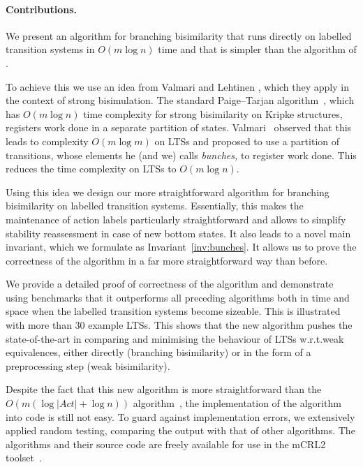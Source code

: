 \documentclass[a4paper,10pt]{article}
\theoremstyle{definition}
\theoremstyle{plain}
\newcommand{\bigo}[1]{{O\!\left(#1\right)}}
\newcommand{\size}[1]{\left\lvert #1 \right\rvert}
\begin{document}
\paragraph{Contributions.}
We present an algorithm for branching bisimilarity that runs directly on labelled transition systems in $\bigo{m \log n}$ time and that is simpler than the algorithm of \cite{GJKW2017,GrooteW16tacas}.

To achieve this we use an idea
from Valmari and Lehtinen \cite{Valmari2009,ValmariL08}, which they apply in the context of strong bisimulation.
The standard Paige--Tarjan algorithm~\cite{PT87},
which has $\bigo{m \log n}$ time complexity for strong bisimilarity on Kripke structures,
registers work done in a separate partition of states.
Valmari~\cite{Valmari2009} observed that this leads to complexity $\bigo{m \log m}$ on LTSs
and proposed to use a partition of transitions,
whose elements he (and we) calls \textit{bunches,}
to register work done.
This reduces the time complexity on LTSs to $\bigo{m \log n}$.

Using this idea we design our more straightforward algorithm for branching bisimilarity on labelled transition
systems.
Essentially, this makes the maintenance of action labels particularly straightforward and allows to simplify
stability reassessment in case of new bottom states. It also leads to a novel main invariant,
which we formulate as Invariant~\ref{inv:bunches}. It allows us to prove the correctness of the algorithm in a far more straightforward way than before.

We provide a detailed proof of correctness of the algorithm
and demonstrate using benchmarks that it outperforms all
preceding algorithms both in time and space when the labelled transition systems become sizeable.
This is illustrated with more than 30 example LTSs.
This shows that the new algorithm pushes the state-of-the-art in comparing and minimising the behaviour of LTSs w.r.t.\@ weak equivalences,
either directly (branching bisimilarity) or in the form of a preprocessing step (weak bisimilarity).

Despite the fact that this new algorithm
is more straightforward than the $\bigo{m (\log \size{\mathit{Act}} + \log n)}$ algorithm~\cite{GJKW2017}, the implementation of the algorithm into code is still not easy.
To guard against implementation errors, we extensively applied random testing,
comparing the output with that of other algorithms.
The algorithms and their source code are freely available for use in
the mCRL2 toolset~\cite{DBLP:conf/tacas/BunteGKLNVWWW19}.
%
\end{document}
